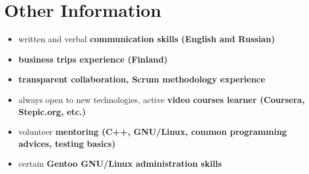 \section*{Other Information}
\begin{itemize}
    \item written and verbal \bfseries communication skills \mdseries (English and Russian)
    \item \bfseries business trips \mdseries experience (Finland)
    \item \bfseries transparent \mdseries collaboration, \bfseries Scrum \mdseries methodology experience
    \item always open to new technologies, active \bfseries video courses \mdseries learner (Coursera, Stepic.org, etc.)
    \item volunteer \bfseries mentoring \mdseries (C++, GNU/Linux, common programming advices, testing basics)
    \item certain \bfseries Gentoo \mdseries GNU/Linux administration skills
\end{itemize}

